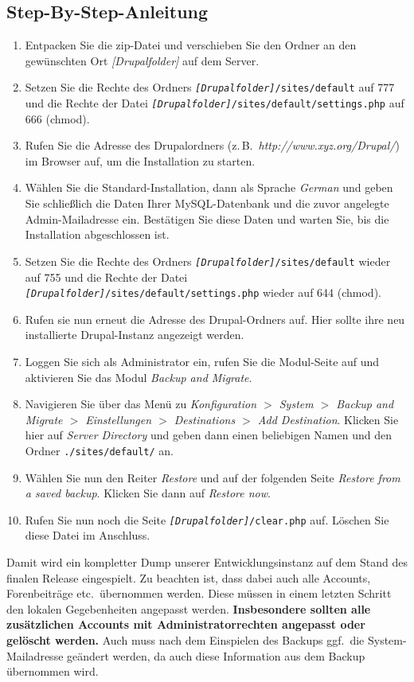 \documentclass[a4paper,11pt,twoside]{article}
\begin{document}
\subsection{Step-By-Step-Anleitung}
\begin{enumerate}
\item Entpacken Sie die zip-Datei und verschieben Sie den Ordner an den
  gewünschten Ort \textit{[Drupalfolder]} auf dem Server.
\item Setzen Sie die Rechte des Ordners
  \texttt{\textit{[Drupalfolder]}/sites/default} auf 777 und die Rechte der
  Datei \texttt{\textit{[Drupalfolder]}/sites/default/settings.php} auf 666
  (chmod).
\item Rufen Sie die Adresse des Drupalordners
  (z.\,B.\ \textit{http://www.xyz.org/Drupal/}) im Browser auf, um die
  Installation zu starten.
\item Wählen Sie die Standard-Installation, dann als Sprache \emph{German} und
  geben Sie schließlich die Daten Ihrer MySQL-Datenbank und die zuvor
  angelegte Admin-Mailadresse ein. Bestätigen Sie diese Daten und warten Sie,
  bis die Installation abgeschlossen ist.
\item Setzen Sie die Rechte des Ordners
  \texttt{\textit{[Drupalfolder]}/sites/default} wieder auf 755 und die Rechte
  der Datei \texttt{\textit{[Drupalfolder]}/sites/default/settings.php} wieder
  auf 644 (chmod).
\item Rufen sie nun erneut die Adresse des Drupal-Ordners auf. Hier sollte
  ihre neu installierte Drupal-Instanz angezeigt werden.
\item Loggen Sie sich als Administrator ein, rufen Sie die Modul-Seite auf und
  aktivieren Sie das Modul \emph{Backup and Migrate}.
\item Navigieren Sie über das Menü zu \emph{Konfiguration $>$ System $>$
  Backup and Migrate $>$ Einstellungen $>$ Destinations $>$ Add Destination}.
  Klicken Sie hier auf \emph{Server Directory} und geben dann einen beliebigen
  Namen und den Ordner \texttt{./sites/default/} an.
\item Wählen Sie nun den Reiter \emph{Restore} und auf der folgenden Seite
  \emph{Restore from a saved backup}. Klicken Sie dann auf \emph{Restore now}.
\item Rufen Sie nun noch die Seite \texttt{\textit{[Drupalfolder]}/clear.php}
  auf.  Löschen Sie diese Datei im Anschluss.
\end{enumerate}
Damit wird ein kompletter Dump unserer Entwicklungsinstanz auf dem Stand des
finalen Release eingespielt. Zu beachten ist, dass dabei auch alle Accounts,
Forenbeiträge etc.\ übernommen werden. Diese müssen in einem letzten Schritt
den lokalen Gegebenheiten angepasst werden. \textbf{Insbesondere sollten alle
  zusätzlichen Accounts mit Administratorrechten angepasst oder gelöscht
  werden.} Auch muss nach dem Einspielen des Backups ggf.\ die
System-Mailadresse geändert werden, da auch diese Information aus dem Backup
übernommen wird.
\end{document}
